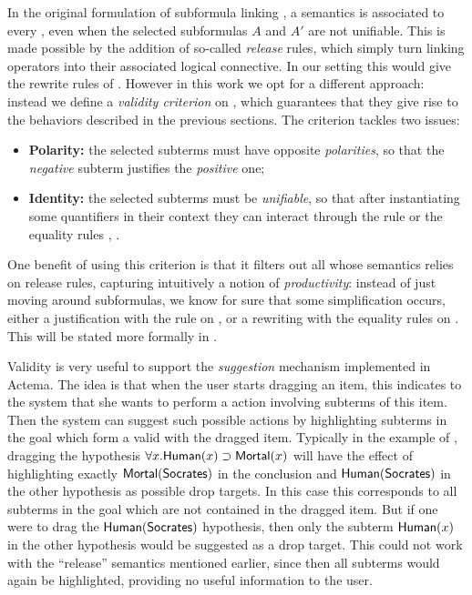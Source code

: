 In the original formulation of subformula linking , a
semantics is associated to every , even when the selected
subformulas $A$ and $A'$ are not unifiable. This is made possible by the
addition of so-called \emph{release} rules, which simply turn linking operators into their
associated logical connective. In our setting this would give the rewrite rules
of . However in this work we opt for a different approach:
instead we define a \emph{validity criterion} on , which guarantees that
they give rise to the behaviors described in the previous sections. The
criterion tackles two issues:
\begin{itemize}
  \item \textbf{Polarity:} the selected subterms must have opposite
  \emph{polarities}, so that the \emph{negative} subterm justifies the
  \emph{positive} one;
  \item \textbf{Identity:} the selected subterms must be \emph{unifiable}, so
  that after instantiating some quantifiers in their context they can interact
  through the {} rule or the equality rules {,
  }.
\end{itemize}
One benefit of using this criterion is that it filters out all  whose
semantics relies on release rules, capturing intuitively a notion of
\emph{productivity}: instead of just moving around subformulas, we know for sure
that some simplification occurs, either a justification with the {}
rule on , or a rewriting with the equality rules on . This will be stated more formally in .

Validity is very useful to support the \emph{suggestion} mechanism implemented
in Actema. The idea is that when the user starts dragging an item, this
indicates to the system that she wants to perform a  action involving
subterms of this item. Then the system can suggest such possible actions by
highlighting subterms in the goal which form a valid  with the dragged
item. Typically in the example of , dragging the hypothesis
$\forall x. \mbox{\textsf{Human}}(x) \supset \mbox{\textsf{Mortal}}(x)$ will have the effect of highlighting
exactly $\mbox{\textsf{Mortal}}(\mbox{\textsf{Socrates}})$ in the conclusion and $\mbox{\textsf{Human}}(\mbox{\textsf{Socrates}})$ in the
other hypothesis as possible drop targets. In this case this corresponds to all
subterms in the goal which are not contained in the dragged item. But if one
were to drag the $\mbox{\textsf{Human}}(\mbox{\textsf{Socrates}})$ hypothesis, then only the subterm
$\mbox{\textsf{Human}}(x)$ in the other hypothesis would be suggested as a drop target. This
could not work with the ``release'' semantics mentioned earlier, since then all
subterms would again be highlighted, providing no useful information to the
user.

